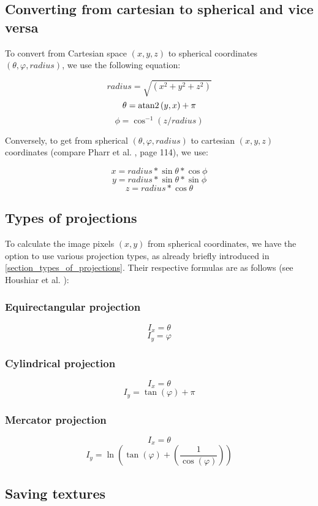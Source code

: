 \subsection{Converting from cartesian to spherical and vice versa}

To convert from Cartesian space {$(x, y, z)$} to spherical coordinates {$(\theta, \varphi, radius)$}, we use the following equation:

$$radius = \sqrt{ (x^2 + y^2 + z^2) } $$
$$\theta = {\rm atan2} \left(y , x\right) + \pi$$
$$\phi = \cos^{-1} (z / radius)$$

Conversely, to get from spherical {$(\theta, \varphi, radius)$} to cartesian {$(x, y, z)$} coordinates (compare Pharr et al. \parencite{Pharr:2010:PBR:1854996}, page 114), we use:

$$x = radius * \sin \theta * \cos \phi$$
$$y = radius * \sin \theta * \sin \phi$$
$$z = radius * \cos \theta$$

\subsection{Types of projections}

To calculate the image pixels {$(x, y)$} from spherical coordinates, we have the option to use various projection types, as already briefly introduced in \ref{section_types_of_projections}. Their respective formulas are as follows (see Houshiar et al. \parencite{houshiar2015a}):

\subsubsection{Equirectangular projection}

$$I_x = \theta$$
$$I_y = \varphi$$

\subsubsection{Cylindrical projection}

$$I_x = \theta$$
$$I_y = \tan(\varphi) + \pi$$

\subsubsection{Mercator projection}

$$I_x = \theta$$
$$I_y = \ln \left(  \tan \left( \varphi \right) +  \left( \frac{1}{ \cos(\varphi) } \right) \right)$$

\subsection{Saving textures}

